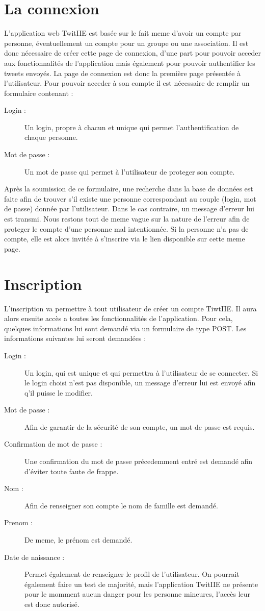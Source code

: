 \documentclass[a4paper, 12pt]{article}
\begin{document}
\section{La connexion}	
L'application web TwitIIE est basée sur le fait meme d'avoir un compte par personne, éventuellement un compte pour un groupe ou une association. Il est donc nécessaire de créer cette page de connexion, d'une part pour pouvoir acceder aux fonctionnalités de l'application mais également pour pouvoir authentifier les tweets envoyés.
La page de connexion est donc la première page présentée à l'utilisateur. Pour pouvoir acceder à son compte il est nécessaire de remplir un formulaire contenant : 
\begin{description}
\item[Login :] Un login, propre à chacun et unique qui permet l'authentification de chaque personne.
\item[Mot de passe :] Un mot de passe qui permet à l'utilisateur de proteger son compte.
\end{description}
Après la soumission de ce formulaire, une recherche dans la base de données est faite afin de trouver s'il existe une personne correspondant au couple (login, mot de passe) donnée par l'utilisateur.
Dans le cas contraire, un message d'erreur lui est transmi. Nous restons tout de meme vague sur la nature de l'erreur afin de proteger le compte d'une personne mal intentionnée.
Si la personne n'a pas de compte, elle est alors invitée à s'inscrire via le lien disponible sur cette meme page. 

\section{Inscription}
L'inscription va permettre à tout utilisateur de créer un compte TiwtIIE. Il aura alors ensuite accès a toutes les fonctionnalités de l'application.
Pour cela, quelques informations lui sont demandé via un formulaire de type POST. Les informations suivantes lui seront demandées : 
\begin{description}
\item[Login :] Un login, qui est unique et qui permettra à l'utilisateur de se connecter. Si le login choisi n'est pas disponible, un message d'erreur lui est envoyé afin q'il puisse le modifier.
\item[Mot de passe :] Afin de garantir de la sécurité de son compte, un mot de passe est requis.
\item[Confirmation de mot de passe :] Une confirmation du mot de passe précedemment entré est demandé afin d'éviter toute faute de frappe.
\item[Nom :] Afin de renseigner son compte le nom de famille est demandé.
\item[Prenom :] De meme, le prénom est demandé.
\item[Date de naissance :] Permet également de renseigner le profil de l'utilisateur. On pourrait également faire un test de majorité, mais l'application TwitIIE ne présente pour le momment aucun danger pour les personne mineures, l'accès leur est donc autorisé.
\end{description}
\end{document}
